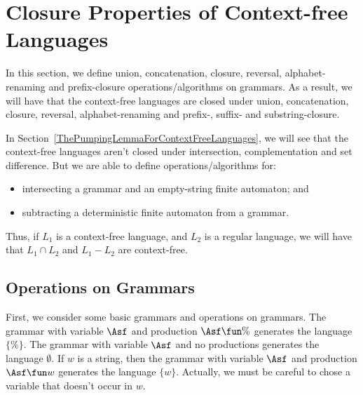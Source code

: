 \section{Closure Properties of Context-free Languages}
\label{ClosurePropertiesOfContextFreeLanguages}

%
In this section, we define union, concatenation, closure, reversal,
alphabet-renaming and prefix-closure operations/algorithms on
grammars.  As a result, we will have that the context-free languages
are closed under union, concatenation, closure, reversal,
alphabet-renaming and prefix-, suffix- and substring-closure.

In Section~\ref{ThePumpingLemmaForContextFreeLanguages}, we
will see that the context-free languages aren't closed under
intersection, complementation and set difference.
But we are able to define operations/algorithms for:
\begin{itemize}
\item intersecting a grammar and an empty-string finite automaton; and

\item subtracting a deterministic finite automaton from a grammar.
\end{itemize}
Thus, if $L_1$ is a context-free language, and $L_2$ is a regular
language, we will have that $L_1\cap L_2$ and $L_1-L_2$ are
context-free.

\subsection{Operations on Grammars}

First, we consider some basic grammars and operations on grammars.
The grammar with variable $\Asf$ and production $\Asf\fun\%$
generates the language $\{\%\}$.
The grammar with variable $\Asf$ and no productions generates 
the language $\emptyset$.
If $w$ is a string, then the grammar with variable $\Asf$ and
production $\Asf\fun w$ generates the language $\{w\}$.
Actually, we must be careful to chose a variable that doesn't occur
in $w$.

